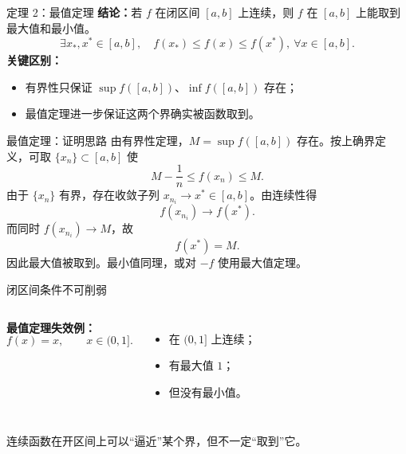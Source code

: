 ﻿\documentclass[aspectratio=169,11pt]{ctexbeamer}
\begin{document}
\begin{frame}{定理 2：最值定理}
\textbf{结论：}若 $f$ 在闭区间 $[a,b]$ 上连续，则 $f$ 在 $[a,b]$ 上能取到最大值和最小值。
\[
  \exists x_*,x^*\in[a,b],\quad f(x_*)\le f(x)\le f(x^*),\ \forall x\in[a,b].
\]
\vspace{0.6em}
\textbf{关键区别：}
\begin{itemize}
  \item 有界性只保证 $\sup f([a,b])$、$\inf f([a,b])$ 存在；
  \item 最值定理进一步保证这两个界确实被函数取到。
\end{itemize}
\end{frame}

\begin{frame}{最值定理：证明思路}
由有界性定理，$M=\sup f([a,b])$ 存在。按上确界定义，可取 $\{x_n\}\subset[a,b]$ 使
\[
  M-\frac1n\le f(x_n)\le M.
\]
由于 $\{x_n\}$ 有界，存在收敛子列 $x_{n_i}\to x^*\in[a,b]$。由连续性得
\[
  f(x_{n_i})\to f(x^*).
\]
而同时 $f(x_{n_i})\to M$，故
\[
  f(x^*)=M.
\]
因此最大值被取到。最小值同理，或对 $-f$ 使用最大值定理。
\end{frame}

\begin{frame}{闭区间条件不可削弱}
\begin{columns}[T]
\textbf{最值定理失效例：}
\[
  f(x)=x,\qquad x\in(0,1].
\]
\begin{itemize}
  \item 在 $(0,1]$ 上连续；
  \item 有最大值 $1$；
  \item 但没有最小值。
\end{itemize}

\end{columns}
\vspace{0.4em}
连续函数在开区间上可以“逼近”某个界，但不一定“取到”它。
\end{frame}
\end{document}

